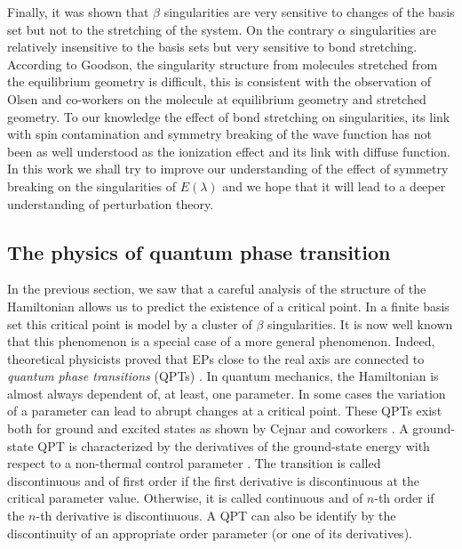 \documentclass[11pt,a4paper]{article}
\begin{document}
Finally, it was shown that $\beta$ singularities are very sensitive to changes of the basis set but not to the stretching of the system. On the contrary $\alpha$ singularities are relatively insensitive to the basis sets but very sensitive to bond stretching. According to Goodson, \cite{Goodson_2004} the singularity structure from molecules stretched from the equilibrium geometry is difficult, this is consistent with the observation of Olsen and co-workers  \cite{Olsen_2000} on the  molecule at equilibrium geometry and stretched geometry. To our knowledge the effect of bond stretching on singularities, its link with spin contamination and symmetry breaking of the wave function has not been as well understood as the ionization effect and its link with diffuse function.  In this work we shall try to improve our understanding of the effect of symmetry breaking on the singularities of $E(\lambda)$ and we hope that it will lead to a deeper understanding of perturbation theory.

\subsection{The physics of quantum phase transition}

In the previous section, we saw that a careful analysis of the structure of the Hamiltonian allows us to predict the existence of a critical point. In a finite basis set this critical point is model by a cluster of $\beta$ singularities. It is now well known that this phenomenon is a special case of a more general phenomenon. Indeed, theoretical physicists proved that EPs close to the real axis are connected to \textit{quantum phase transitions} (QPTs) \cite{Heiss_1988, Heiss_2002, Cejnar_2005, Cejnar_2007, Cejnar_2009, Borisov_2015, Sindelka_2017}. In quantum mechanics, the Hamiltonian is almost always dependent of, at least, one parameter. In some cases the variation of a parameter can lead to abrupt changes at a critical point. These QPTs exist both for ground and excited states as shown by Cejnar and coworkers \cite{Cejnar_2009, Sachdev_2011, Cejnar_2015, Cejnar_2016, Caprio_2008, Macek_2019}. A ground-state QPT is characterized by the derivatives of the ground-state energy with respect to a non-thermal control parameter \cite{Cejnar_2009, Sachdev_2011}. The transition is called discontinuous and of first order if the first derivative is discontinuous at the critical parameter value. Otherwise, it is called continuous and of $n$-th order if the $n$-th derivative is discontinuous. A QPT can also be identify by the discontinuity of an appropriate order parameter (or one of its derivatives). 
\end{document}
